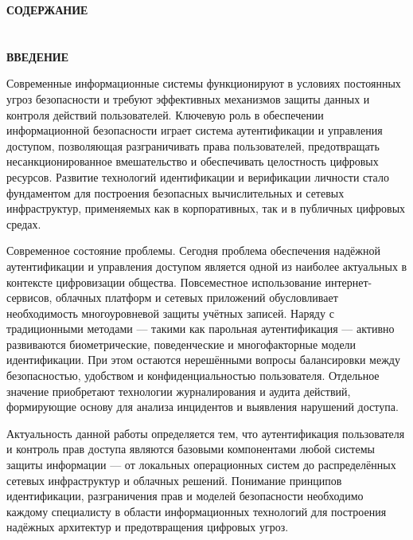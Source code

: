 \documentclass{SibFU-docs}
\begin{document}
\newpage

\thispagestyle{empty}
\begin{center}
\bfseries СОДЕРЖАНИЕ
\end{center}
\vspace{-6pt}
\tableofcontents
\clearpage

\section*{}
\vspace*{-2.5em}
\begin{center}\textbf{ВВЕДЕНИЕ}\end{center}
{}
Современные информационные системы функционируют в условиях постоянных угроз безопасности и требуют эффективных механизмов защиты данных и контроля действий пользователей. Ключевую роль в обеспечении информационной безопасности играет система аутентификации и управления доступом, позволяющая разграничивать права пользователей, предотвращать несанкционированное вмешательство и обеспечивать целостность цифровых ресурсов. Развитие технологий идентификации и верификации личности стало фундаментом для построения безопасных вычислительных и сетевых инфраструктур, применяемых как в корпоративных, так и в публичных цифровых средах.

Современное состояние проблемы. Сегодня проблема обеспечения надёжной аутентификации и управления доступом является одной из наиболее актуальных в контексте цифровизации общества. Повсеместное использование интернет-сервисов, облачных платформ и сетевых приложений обусловливает необходимость многоуровневой защиты учётных записей. Наряду с традиционными методами — такими как парольная аутентификация — активно развиваются биометрические, поведенческие и многофакторные модели идентификации. При этом остаются нерешёнными вопросы балансировки между безопасностью, удобством и конфиденциальностью пользователя. Отдельное значение приобретают технологии журналирования и аудита действий, формирующие основу для анализа инцидентов и выявления нарушений доступа.

Актуальность данной работы определяется тем, что аутентификация пользователя и контроль прав доступа являются базовыми компонентами любой системы защиты информации — от локальных операционных систем до распределённых сетевых инфраструктур и облачных решений. Понимание принципов идентификации, разграничения прав и моделей безопасности необходимо каждому специалисту в области информационных технологий для построения надёжных архитектур и предотвращения цифровых угроз.
\end{document}
